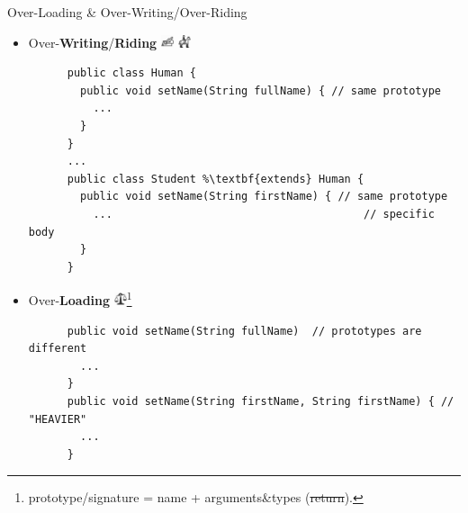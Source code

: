 \documentclass[English,t,%
hyperref={%
    pdftitle={FISA-DE2 OOP in Java},%
    pdfauthor={Guillaume Muller},%
    pdfsubject={OOP in Java},%
    pdfkeywords={OOP,Java}%
    },%
xcolor={pdftex,svgnames} %
]{beamer}
\begin{document}
\begin{frame}[fragile]{Over-Loading \& Over-Writing/Over-Riding}

  \begin{itemize}
%
    \item Over-\textbf{Writing}/\textbf{Riding} \hspace{2em} \includegraphics[width=1em]{images2/writing.png} \hspace{2em} \includegraphics[width=1em]{images2/riding1.png}
    \begin{lstlisting}
      public class Human {
        public void setName(String fullName) { // same prototype
          ...
        }
      }
      ...
      public class Student %\textbf{extends} Human {
        public void setName(String firstName) { // same prototype
          ...                                       // specific body
        }
      }
    \end{lstlisting}
%
    \vspace{2em}
    \item Over-\textbf{Loading} \hspace{2em} \includegraphics[width=1em]{images2/overweighted_scale.png}\footnote{prototype/signature = name + arguments\&types (\sout{return}).}
    \begin{lstlisting}
      public void setName(String fullName)  // prototypes are different
        ...
      }
      public void setName(String firstName, String firstName) { // "HEAVIER"
        ...
      }
    \end{lstlisting}
%
  \end{itemize}

\end{frame}
\end{document}
